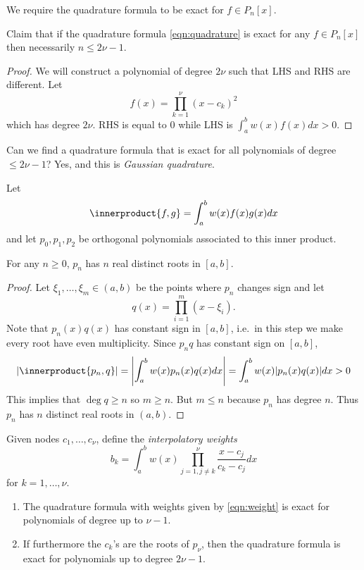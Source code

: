 \documentclass[a4paper]{article}
\newcommand*{\inner}{\innerproduct}
\begin{document}
We require the quadrature formula to be exact for \(f \in P_n[x]\).

Claim that if the quadrature formula \eqref{eqn:quadrature} is exact for any \(f \in P_n[x]\) then necessarily \(n \leq 2\nu - 1\).

\begin{proof}
  We will construct a polynomial of degree \(2\nu\) such that LHS and RHS are different. Let
  \[
    f(x) = \prod_{k = 1}^\nu (x - c_k)^2
  \]
  which has degree \(2\nu\). RHS is equal to \(0\) while LHS is \(\int_a^b w(x)f(x)dx > 0\).
\end{proof}

Can we find a quadrature formula that is exact for all polynomials of degree \(\leq 2\nu - 1\)? Yes, and this is \emph{Gaussian quadrature}.

Let
\[
  \inner{f, g} = \int_a^b w(x)f(x)g(x) dx
\]
and let \(p_0, p_1, p_2\) be orthogonal polynomials associated to this inner product.

\begin{theorem}
  For any \(n \geq 0\), \(p_n\) has \(n\) real distinct roots in \([a, b]\).
\end{theorem}

\begin{proof}
  Let \(\xi_1, \dots, \xi_m \in (a, b)\) be the points where \(p_n\) changes sign and let
  \[
    q(x) = \prod_{i = 1}^m (x - \xi_i).
  \]
  Note that \(p_n(x)q(x)\) has constant sign in \([a, b]\), i.e.\ in this step we make every root have even multiplicity. Since \(p_nq\) has constant sign on \([a, b]\),
  \[
    |\inner{p_n, q}| = \left| \int_a^b w(x)p_n(x)q(x) dx \right| = \int_a^b w(x) |p_n(x)q(x)| dx > 0
  \]
  This implies that \(\deg q \geq n\) so \(m \geq n\). But \(m \leq n\) because \(p_n\) has degree \(n\). Thus \(p_n\) has \(n\) distinct real roots in \((a, b)\).
\end{proof}

Given nodes \(c_1, \dots, c_\nu\), define the \emph{interpolatory weights}
\begin{equation}
  \label{eqn:weight}
  b_k = \int_a^b w(x) \prod_{j = 1, j \neq k}^\nu \frac{x - c_j}{c_k - c_j} dx
  \tag{\(\ast\ast\)}
\end{equation}
for \(k = 1, \dots, \nu\).

\begin{theorem}\leavevmode
  \begin{enumerate}
  \item The quadrature formula with weights given by \eqref{eqn:weight} is exact for polynomials of degree up to \(\nu - 1\).
  \item If furthermore the \(c_k\)'s are the roots of \(p_\nu\), then the quadrature formula is exact for polynomials up to degree \(2\nu - 1\).
  \end{enumerate}
\end{theorem}
\end{document}
